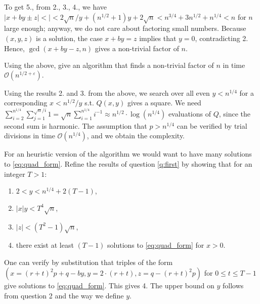 \documentclass[11pt]{exam}
\theoremstyle{definition}
\begin{document}
{\begin{questions}
\begin{solution}
		To get 5., from 2., 3., 4., we have  $|x+by \pm z| < | < 2\sqrt{n}/y+(n^{1/2}+1)y +2\sqrt{n} < n^{3/4} + 3n^{1/2}+n^{1/4} < n$ for $n$ large enough; anyway, we do not care about factoring small numbers. Because $(x,y,z)$ is a solution, the case $x+by = z$ implies that $y=0$, contradicting 2. Hence, $\gcd(x+by-z, n)$ gives a non-trivial factor of $n$. 
	\end{solution}
	\item Using the above, give an algorithm that finds a non-trivial factor of $n$ in time $\mathcal{O}(n^{1/2+ \varepsilon}).$
	\begin{solution}
		Using the results 2. and 3. from the above, we search over all even $y < n^{1/4}$ for a corresponding $x < n^{1/2}/y$ s.t. $Q(x,y)$ gives a square. We need $\sum_{i=2}^{n^{1/4}} \sum_{j=1}^{\sqrt{n}/i} 1 = \sqrt{n} \sum_{i=1}^{n^{1/4}} i^{-1} \approx n^{1/2}\cdot \log(n^{1/4})$ evaluations of $Q$, since the second sum is harmonic. The assumption that $p>n^{1/4}$ can be verified by trial divisions in time $\mathcal{O}(n^{1/4})$, and we obtain the complexity.
	\end{solution} 
	\question For an heuristic version of the algorithm we would want to have many solutions to \eqref{eq:quad_form}. Refine the results of question \ref*{q:first} by showing that for an integer $T>1$:
	\begin{enumerate}
		\item $2 < y < n^{1/4} + 2(T-1)$,
		\item $|x|y < T^4 \sqrt{n} $,
		\item $|z| < (T^2 - 1) \sqrt{n}$,
		\item there exist at least $(T-1)$ solutions to \eqref{eq:quad_form} for $x>0$.
	\end{enumerate}
	\begin{solution}
		One can verify by substitution that triples of the form $(x = (r+t)^2p+q-by, y=2\cdot(r+t), z=q - (r+t)^2p )$ for $0\leq t \leq T-1$ give solutions to \eqref{eq:quad_form}. This gives 4. The upper bound on $y$ follows from question 2 and the way we define $y$.
		

\end{solution}
\end{questions}}
\end{document}
